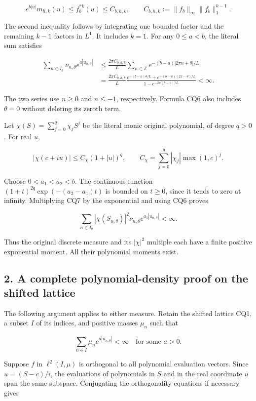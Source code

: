 \documentclass{article}
\begin{document}
\[
e^{b|u|}m_{h,k}(u)
\le f_b^{*k}(u)
\le C_{b,h,k},\qquad
C_{b,h,k}:=\|f_b\|_\infty\|f_b\|_1^{k-1}.
\tag{CQ5}
\]

The second inequality follows by integrating one bounded factor and the remaining \(k-1\) factors in \(L^1\). It includes \(k=1\). For any \(0 \le a < b\), the literal sum satisfies

\[
\begin{aligned}
\sum_{n\in I_\theta}\nu_{n,\theta}e^{a|u_{n,\theta}|}
&\le\frac{2\pi C_{b,h,k}}L
\sum_{n\in\mathbb Z}e^{-(b-a)|2\pi n+\theta|/L}\\
&=\frac{2\pi C_{b,h,k}}L
\frac{e^{-(b-a)\theta/L}+e^{-(b-a)(2\pi-\theta)/L}}
{1-e^{-2\pi(b-a)/L}}<\infty.
\end{aligned}
\tag{CQ6}
\]

The two series use \(n \ge 0\) and \(n \le -1\), respectively. Formula CQ6 also includes \(\theta=0\) without deleting its zeroth term.

Let \(\chi(S)=\sum_{j=0}^q \chi_j S^j\) be the literal monic original polynomial, of degree \(q>0\). For real \(u\),

\[
|\chi(c+iu)|\le
C_\chi(1+|u|)^q,\qquad
C_\chi=\sum_{j=0}^q|\chi_j|\max(1,c)^j.
\tag{CQ7}
\]

Choose \(0 < a_1 < a_2 < b\). The continuous function \((1+t)^{2q} \exp(-(a_2-a_1)t)\) is bounded on \(t \ge 0\), since it tends to zero at infinity. Multiplying CQ7 by the exponential and using CQ6 proves

\[
\sum_{n\in I_\theta}
|\chi(S_{n,\theta})|^2\nu_{n,\theta}
e^{a_1|u_{n,\theta}|}<\infty.
\tag{CQ8}
\]

Thus the original discrete measure and its \(|\chi|^2\) multiple each have a finite positive exponential moment. All their polynomial moments exist.

\subsection{2. A complete polynomial-density proof on the shifted lattice}\label{a-complete-polynomial-density-proof-on-the-shifted-lattice}

The following argument applies to either measure. Retain the shifted lattice CQ1, a subset \(I\) of its indices, and positive masses \(\mu_n\) such that

\[
\sum_{n\in I}\mu_ne^{a|u_{n,\theta}|}<\infty
\quad\text{for some }a>0.
\tag{CQ9}
\]

Suppose \(f\) in \(\ell^2(I,\mu)\) is orthogonal to all polynomial evaluation vectors. Since \(u=(S-c)/i\), the evaluations of polynomials in \(S\) and in the real coordinate \(u\) span the same subspace. Conjugating the orthogonality equations if necessary gives
\end{document}
